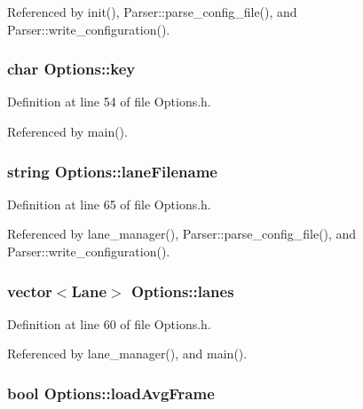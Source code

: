 \-Referenced by init(), \-Parser\-::parse\-\_\-config\-\_\-file(), and \-Parser\-::write\-\_\-configuration().

\hypertarget{class_options_aca9c5b9267460a683e2f9ef45f6aaf74}{
\subsubsection[{key}]{\setlength{\rightskip}{0pt plus 5cm}char {\bf \-Options\-::key}}}
\label{class_options_aca9c5b9267460a683e2f9ef45f6aaf74}


\-Definition at line 54 of file \-Options.\-h.



\-Referenced by main().

\hypertarget{class_options_a635b111055e083a91f228feff6fee1fc}{
\subsubsection[{lane\-Filename}]{\setlength{\rightskip}{0pt plus 5cm}string {\bf \-Options\-::lane\-Filename}}}
\label{class_options_a635b111055e083a91f228feff6fee1fc}


\-Definition at line 65 of file \-Options.\-h.



\-Referenced by lane\-\_\-manager(), \-Parser\-::parse\-\_\-config\-\_\-file(), and \-Parser\-::write\-\_\-configuration().

\hypertarget{class_options_a965c30864fffe291850b3a68834150ea}{
\subsubsection[{lanes}]{\setlength{\rightskip}{0pt plus 5cm}vector$<${\bf \-Lane}$>$ {\bf \-Options\-::lanes}}}
\label{class_options_a965c30864fffe291850b3a68834150ea}


\-Definition at line 60 of file \-Options.\-h.



\-Referenced by lane\-\_\-manager(), and main().

\hypertarget{class_options_a3a89b79a7b1e423ba934990b182fd887}{
\subsubsection[{load\-Avg\-Frame}]{\setlength{\rightskip}{0pt plus 5cm}bool {\bf \-Options\-::load\-Avg\-Frame}}}
\label{class_options_a3a89b79a7b1e423ba934990b182fd887}


